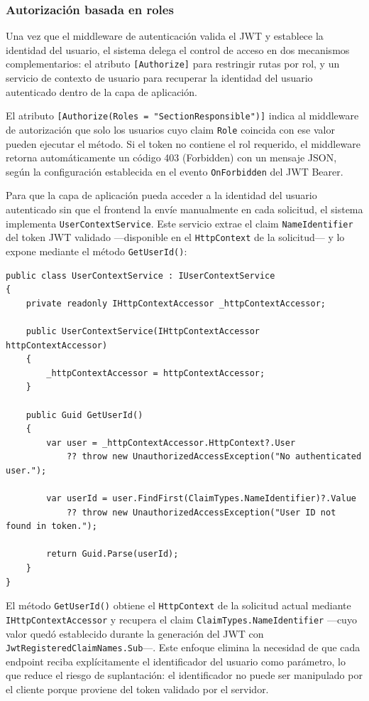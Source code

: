 \subsubsection{Autorización basada en roles}

Una vez que el middleware de autenticación valida el JWT y establece la identidad del usuario, el sistema delega el control de acceso en dos mecanismos complementarios: el atributo \texttt{[Authorize]} para restringir rutas por rol, y un servicio de contexto de usuario para recuperar la identidad del usuario autenticado dentro de la capa de aplicación.

El atributo \texttt{[Authorize(Roles = "SectionResponsible")]} indica al middleware de autorización que solo los usuarios cuyo claim \texttt{Role} coincida con ese valor pueden ejecutar el método. Si el token no contiene el rol requerido, el middleware retorna automáticamente un código 403 (Forbidden) con un mensaje JSON, según la configuración establecida en el evento \texttt{OnForbidden} del JWT Bearer.

Para que la capa de aplicación pueda acceder a la identidad del usuario autenticado sin que el frontend la envíe manualmente en cada solicitud, el sistema implementa \texttt{UserContextService}. Este servicio extrae el claim \texttt{NameIdentifier} del token JWT validado —disponible en el \texttt{HttpContext} de la solicitud— y lo expone mediante el método \texttt{GetUserId()}:

\begin{lstlisting}[language={[Sharp]C}, caption={Servicio de contexto de usuario autenticado}, label={lst:usercontext}]
public class UserContextService : IUserContextService
{
    private readonly IHttpContextAccessor _httpContextAccessor;

    public UserContextService(IHttpContextAccessor httpContextAccessor)
    {
        _httpContextAccessor = httpContextAccessor;
    }

    public Guid GetUserId()
    {
        var user = _httpContextAccessor.HttpContext?.User
            ?? throw new UnauthorizedAccessException("No authenticated user.");

        var userId = user.FindFirst(ClaimTypes.NameIdentifier)?.Value
            ?? throw new UnauthorizedAccessException("User ID not found in token.");

        return Guid.Parse(userId);
    }
}
\end{lstlisting}

El método \texttt{GetUserId()} obtiene el \texttt{HttpContext} de la solicitud actual mediante \texttt{IHttpContextAccessor} y recupera el claim \texttt{ClaimTypes.NameIdentifier} —cuyo valor quedó establecido durante la generación del JWT con \texttt{JwtRegisteredClaimNames.Sub}—.
Este enfoque elimina la necesidad de que cada endpoint reciba explícitamente el identificador del usuario como parámetro, lo que reduce el riesgo de suplantación: el identificador no puede ser manipulado por el cliente porque proviene del token validado por el servidor.

